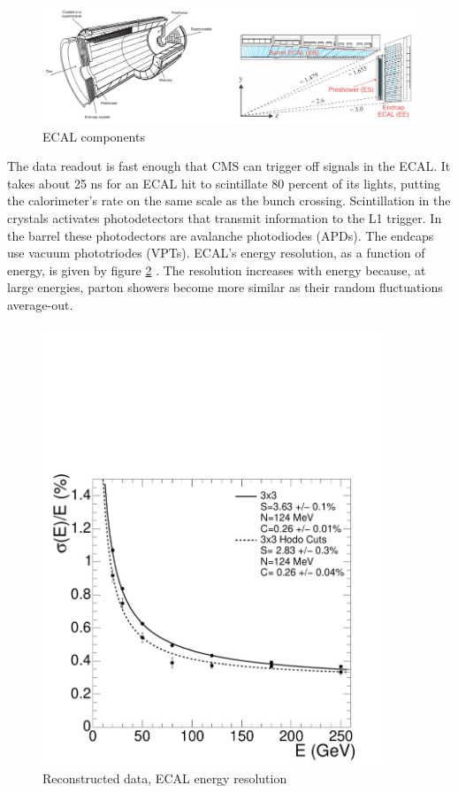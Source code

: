 \begin{figure}[]
\begin{centering}
\includegraphics[width=7in]{Chapter3/importfigs/ecal_performance_with_examples.png}
\par\end{centering}
\caption{ECAL components \cite{Benaglia:2014aqa} \label{fig:ecalComp}}
\end{figure}

The data readout is fast enough that CMS can trigger off signals in the ECAL. It takes about 25 ns for an ECAL hit to scintillate 80 percent of its lights, putting the calorimeter's rate on the same scale as the bunch crossing. Scintillation in the crystals activates photodetectors that transmit information to the L1 trigger. In the barrel these photodectors are avalanche photodiodes (APDs). The endcaps use vacuum phototriodes (VPTs). ECAL's energy resolution, as a function of energy, is given by figure \ref{fig:ecalRes} \cite{Bayatian:2006nff}. The resolution increases with energy because, at large energies, parton showers become more similar as their random fluctuations average-out.

\begin{figure}[]
\begin{centering}
\includegraphics[width=4in]{Chapter3/importfigs/Figure_001-007.pdf}
\par\end{centering}
\caption{Reconstructed data, ECAL energy resolution \cite{Bayatian:2006nff} \label{fig:ecalRes}}
\end{figure}
 
